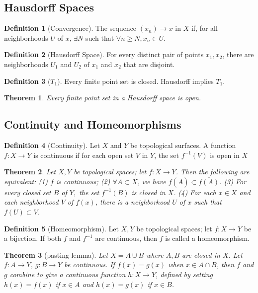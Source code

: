 \documentclass[8pt,reqno,twocolumn]{amsart}
\newtheorem*{theorem*}{Theorem}
\theoremstyle{definition}
\newtheorem*{definition}{Definition}
\begin{document}
\subsection*{Hausdorff Spaces}
\begin{definition}[Convergence]
    The sequence $(x_n) \rightarrow x$ in $X$ if, for all neighborhoods $U$ of $x$, $\exists N$ such that $\forall n \geq N, x_n \in U$. 
\end{definition}
\begin{definition}[Hausdorff Space]
    For every distinct pair of points $x_1, x_2$, there are neighborhoods $U_1$ and $U_2$ of $x_1$ and $x_2$ that are disjoint.
\end{definition}
\begin{definition}[$T_1$]
    Every finite point set is closed. Hausdorff implies $T_1$.
\end{definition}
\begin{theorem*}
    Every finite point set in a Hausdorff space is open.
\end{theorem*}

\subsection*{Continuity and Homeomorphisms}

\begin{definition}[Continuity]
    Let $X$ and $Y$ be topological surfaces. A function $f:X \to Y$ is continuous if for each open set $V$ in $Y$, the set $f^{-1}(V)$ is open in $X$
\end{definition}

\begin{theorem*}
    Let $X,Y$ be topological spaces; let $f: X \to Y$. Then the following are equivalent: (1) $f$ is continuous; (2) $\forall A \subset X$, we have $f(\overline{A}) \subset \overline{f(A)}$. (3) For every closed set $B$ of $Y,$ the set $f^{-1}(B)$ is closed in $X$. (4) For each $x \in X$ and each neighborhood $V$ of $f(x)$, there is a neighborhood $U$ of $x$ such that $f(U) \subset V$.
\end{theorem*}

\begin{definition}[Homeomorphism]
    Let $X,Y$ be topological spaces; let $f: X \to Y$ be a bijection. If both $f$ and $f^{-1}$ are continuous, then $f$ is called a homeomorphism.
\end{definition}

\begin{theorem*}[pasting lemma]
    Let $X = A \cup B$ where $A,B$ are closed in $X$. Let $f: A \to Y$, $g: B \to Y$ be continuous. If $f(x) = g(x)$ when $x \in A \cap B$, then $f$ and $g$ combine to give a continuous function $h: X \to Y$, defined by setting $h(x) = f(x)$ if $x \in A$ and $h(x) = g(x)$ if $x \in B$.
\end{theorem*}
\end{document}
